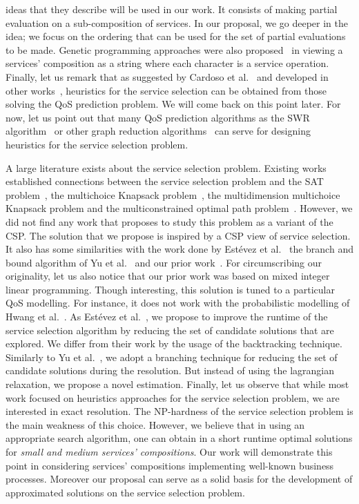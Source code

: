 \documentclass[a4paper]{article}
\begin{document}
ideas that they describe will be used in our work. It consists of making partial evaluation on a sub-composition of 
services. In our proposal, we go deeper in the idea; we focus on the ordering that can be used for the 
set of partial evaluations to be made. Genetic programming approaches were also 
proposed~\cite{Jaeger,Canfora,Cao,cpe3015} in viewing a services' composition as a string where each character is a service 
operation. Finally, let us remark that as suggested by Cardoso et al.~\cite{Cardoso2004281} and developed in other 
works~\cite{DBLP:journals/concurrency/Estevez-AyresGBD11,Yu:2004:SSA:1018413.1019049}, heuristics for the service selection 
can be obtained from those solving the QoS prediction problem. We will come back on this point later. For now, 
let us point out that many QoS 
prediction algorithms as the SWR algorithm~\cite{Cardoso2004281} or other graph reduction algorithms~\cite{GoldmanNgoko,Zheng2} 
can serve for designing heuristics for the service selection problem.


A large literature exists about the service selection problem. Existing works established connections between the service selection problem 
and the SAT problem~\cite{Oh05acomparative}, the multichoice Knapsack problem~\cite{Lee}, the multidimension multichoice Knapsack problem and the 
multiconstrained optimal path problem~\cite{Yu:2004:SSA:1018413.1019049}. However, we did not find any work that proposes to study this problem 
as a variant of the CSP. The solution that we propose is inspired by a CSP view of service selection.  It also has some similarities with the work 
done by Est\'evez et al.~\cite{DBLP:journals/concurrency/Estevez-AyresGBD11} the branch and bound algorithm of Yu et al.~\cite{Yu} and 
our prior work~\cite{JISA}. For circumscribing our originality, let us also notice that our prior work was based on mixed integer linear 
programming. Though interesting, this solution is tuned to a particular QoS modelling. For instance, it does not work with 
the probabilistic modelling of Hwang et al.~\cite{Hwang20075484}. As Est\'evez et al.~\cite{DBLP:journals/concurrency/Estevez-AyresGBD11}, we 
propose to improve the runtime of the service selection algorithm by reducing the set of candidate solutions that are explored. We differ 
from their work by  the usage of the backtracking technique. 
Similarly to Yu et al.~\cite{Yu}, we adopt a branching technique for reducing the set of candidate solutions 
during the resolution. But instead of using the lagrangian relaxation, we propose a novel estimation.
Finally, let us observe that while most work focused on heuristics approaches for the service selection problem, we 
are interested in exact resolution. The NP-hardness of the service selection problem is the main weakness of this 
choice. However, we believe that in using an appropriate search algorithm, one can obtain in a short 
runtime optimal solutions for {\it small and medium services'  compositions}. Our work will demonstrate this point in considering 
services' compositions implementing well-known business processes. Moreover our proposal can serve as a solid basis for the 
development of approximated solutions on the service selection problem. 
\end{document}
